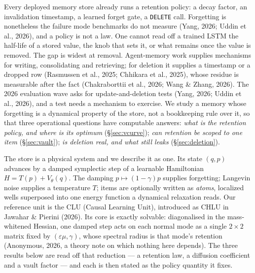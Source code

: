 \documentclass{article}
\begin{document}
Every deployed memory store already runs a retention policy: a decay factor, an invalidation timestamp, a learned forget gate, a \texttt{DELETE} call. Forgetting is nonetheless the failure mode benchmarks do not measure (Yang, 2026; Uddin et al., 2026), and a policy is not a law. One cannot read off a trained LSTM the half-life of a stored value, the knob that sets it, or what remains once the value is removed. The gap is widest at removal. Agent-memory work supplies mechanisms for writing, consolidating and retrieving; for deletion it supplies a timestamp or a dropped row (Rasmussen et al., 2025; Chhikara et al., 2025), whose residue is measurable after the fact (Chakraborttii et al., 2026; Wang \& Zhang, 2026). The 2026 evaluation wave asks for update-and-deletion tests (Yang, 2026; Uddin et al., 2026), and a test needs a mechanism to exercise. We study a memory whose forgetting is a dynamical property of the store, not a bookkeeping rule over it, so that three operational questions have computable answers: \emph{what is the retention policy, and where is its optimum} (\S\ref{sec:vcurve}); \emph{can retention be scoped to one item} (\S\ref{sec:vault}); \emph{is deletion real, and what still leaks} (\S\ref{sec:deletion}).

The store is a physical system and we describe it as one. Its state $(q,p)$ advances by a damped symplectic step of a learnable Hamiltonian $H=T(p)+V_\theta(q)$. The damping $p\mapsto(1-\gamma)p$ supplies forgetting; Langevin noise supplies a temperature $T$; items are optionally written as \emph{atoms}, localized wells superposed into one energy function a dynamical relaxation reads. Our reference unit is the CLU (Causal Learning Unit), introduced as CHLU in Jawahar \& Pierini (2026). Its core is exactly solvable: diagonalised in the mass-whitened Hessian, one damped step acts on each normal mode as a single $2\times2$ matrix fixed by $(\varepsilon\mu,\gamma)$, whose spectral radius is that mode's retention (Anonymous, 2026, a theory note on which nothing here depends). The three results below are read off that reduction --- a retention law, a diffusion coefficient and a vault factor --- and each is then stated as the policy quantity it fixes.
\end{document}
